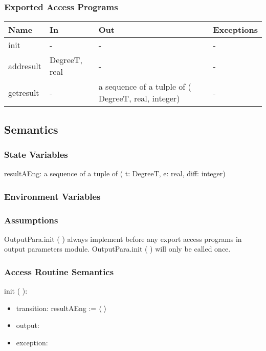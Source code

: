 \documentclass[12pt, titlepage]{article}
\begin{document}
\subsubsection{Exported Access Programs}

\begin{center}
\begin{tabular}{p{2cm} p{5cm} p{5cm} p{2cm}}
\hline
\textbf{Name} & \textbf{In} & \textbf{Out} & \textbf{Exceptions} \\
\hline 
init & - & - & - \\
addresult &  DegreeT, real & - & - \\
getresult & - & a sequence of a tulple of ( DegreeT, real, integer) & - \\



\hline
\end{tabular}
\end{center}


\subsection{Semantics}

\subsubsection{State Variables}
resultAEng: a sequence of a tuple  of ( t: DegreeT, e: real, diff: integer)\\


\subsubsection{Environment Variables}


\subsubsection{Assumptions}
OutputPara.init ( ) always implement before any export access programs in output parameters module.
OutputPara.init ( ) will only be called once.

\subsubsection{ Access Routine Semantics}

\noindent  init ( ):
\begin{itemize}
\item transition: resultAEng := $\langle $ $ \rangle$
\item output:
\item exception: 
\end{itemize}
\end{document}
